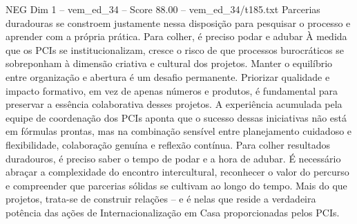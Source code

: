 \begin{textsample}{NEG Dim 1 – vem\_ed\_34 – Score 88.00 – vem\_ed\_34/t185.txt}
Parcerias duradouras se constroem justamente nessa disposição para pesquisar o processo e aprender com a própria prática.
Para colher, é preciso podar e adubar À medida que os PCIs se institucionalizam, cresce o risco de que processos burocráticos se sobreponham à dimensão criativa e cultural dos projetos.
Manter o equilíbrio entre organização e abertura é um desafio permanente.
Priorizar qualidade e impacto formativo, em vez de apenas números e produtos, é fundamental para preservar a essência colaborativa desses projetos.
A experiência acumulada pela equipe de coordenação dos PCIs aponta que o sucesso dessas iniciativas não está em fórmulas prontas, mas na combinação sensível entre planejamento cuidadoso e flexibilidade, colaboração genuína e reflexão contínua.
Para colher resultados duradouros, é preciso saber o tempo de podar e a hora de adubar.
É necessário abraçar a complexidade do encontro intercultural, reconhecer o valor do percurso e compreender que parcerias sólidas se cultivam ao longo do tempo.
Mais do que projetos, trata-se de construir relações – e é nelas que reside a verdadeira potência das ações de Internacionalização em Casa proporcionadas pelos PCIs.

\end{textsample}
